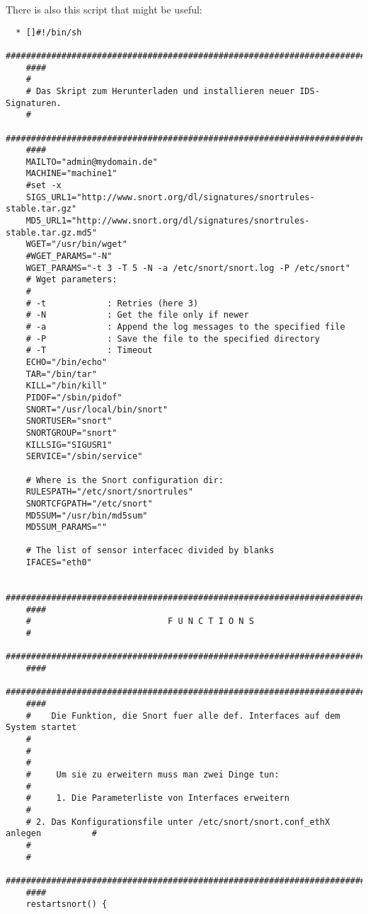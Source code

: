 \documentclass{article}
\begin{document}
There is also this script that might be useful:
\begin{verbatim}
  * []#!/bin/sh
    ###########################################################################
    ####
    #
    # Das Skript zum Herunterladen und installieren neuer IDS-Signaturen.
    #
    ###########################################################################
    ####
    MAILTO="admin@mydomain.de"
    MACHINE="machine1"
    #set -x
    SIGS_URL1="http://www.snort.org/dl/signatures/snortrules-stable.tar.gz"
    MD5_URL1="http://www.snort.org/dl/signatures/snortrules-stable.tar.gz.md5"
    WGET="/usr/bin/wget"
    #WGET_PARAMS="-N"
    WGET_PARAMS="-t 3 -T 5 -N -a /etc/snort/snort.log -P /etc/snort"
    # Wget parameters:
    #
    # -t            : Retries (here 3)
    # -N            : Get the file only if newer
    # -a            : Append the log messages to the specified file
    # -P            : Save the file to the specified directory
    # -T            : Timeout
    ECHO="/bin/echo"
    TAR="/bin/tar"
    KILL="/bin/kill"
    PIDOF="/sbin/pidof"
    SNORT="/usr/local/bin/snort"
    SNORTUSER="snort"
    SNORTGROUP="snort"
    KILLSIG="SIGUSR1"
    SERVICE="/sbin/service"

    # Where is the Snort configuration dir:
    RULESPATH="/etc/snort/snortrules"
    SNORTCFGPATH="/etc/snort"
    MD5SUM="/usr/bin/md5sum"
    MD5SUM_PARAMS=""

    # The list of sensor interfacec divided by blanks
    IFACES="eth0"

    ###########################################################################
    ####
    #                           F U N C T I O N S 
    #
    ###########################################################################
    ####
    ###########################################################################
    ####
    #    Die Funktion, die Snort fuer alle def. Interfaces auf dem System startet    
    #
    #
    #
    #     Um sie zu erweitern muss man zwei Dinge tun:                                
    #
    #     1. Die Parameterliste von Interfaces erweitern                              
    #
    # 2. Das Konfigurationsfile unter /etc/snort/snort.conf_ethX anlegen          #
    #
    #
    ###########################################################################
    ####
    restartsnort() {


\end{verbatim}
\end{document}
